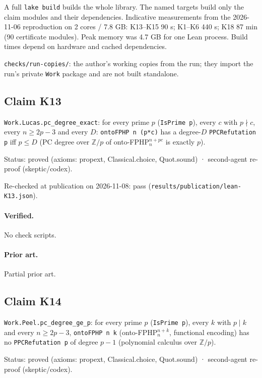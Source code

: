 \documentclass{article}
\begin{document}
A full \texttt{lake build} builds the whole library. The named targets build only the claim modules and their dependencies. Indicative measurements from the 2026-11-06 reproduction on 2 cores / 7.8 GB: K13--K15 90 s; K1--K6 440 s; K18 87 min (90 certificate modules). Peak memory was 4.7 GB for one Lean process. Build times depend on hardware and cached dependencies.

\texttt{checks/run-copies/}: the author's working copies from the run; they import the run's private \texttt{Work} package and are not built standalone.

\subsection*{Claim K13}

\texttt{Work.Lucas.pc\_degree\_exact}: for every prime $p$ (\texttt{IsPrime p}), every $c$ with $p\nmid c$, every $n\ge2p-3$ and every $D$: \texttt{ontoFPHP n (p*c)} has a degree-$D$ \texttt{PPCRefutation p} iff $p\le D$ (PC degree over $\mathbb Z/p$ of onto-FPHP$^{n+pc}_n$ is exactly $p$).

Status: proved (axioms: propext, Classical.choice, Quot.sound) · second-agent re-proof (skeptic/codex).

Re-checked at publication on 2026-11-08: pass (\texttt{results/publication/lean-K13.json}).

\paragraph{Verified.}
No check scripts.

\paragraph{Prior art.} Partial prior art.

\subsection*{Claim K14}

\texttt{Work.Peel.pc\_degree\_ge\_p}: for every prime $p$ (\texttt{IsPrime p}), every $k$ with $p\mid k$ and every $n\ge2p-3$, \texttt{ontoFPHP n k} (onto-FPHP$^{n+k}_n$, functional encoding) has no \texttt{PPCRefutation p} of degree $p-1$ (polynomial calculus over $\mathbb Z/p$).

Status: proved (axioms: propext, Classical.choice, Quot.sound) · second-agent re-proof (skeptic/codex).
\end{document}
